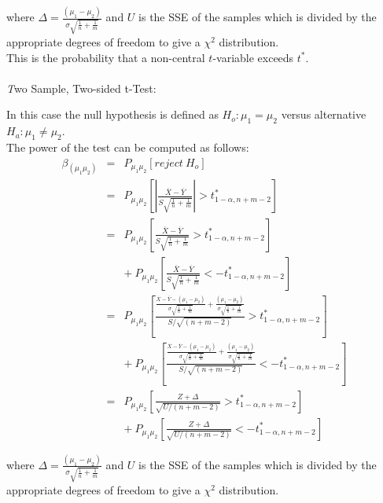 \documentclass[12pt,a4paper]{article}
\theoremstyle{regla}
\theoremstyle{remark}
\theoremstyle{definition}
\theoremstyle{nonumberbreak}
\begin{document}
where $\Delta = \frac{(\mu_1-\mu_2)}{\sigma\sqrt{\frac{1}{n}+\frac{1}{m}}} $ and 
$U$ is the SSE of the samples which is divided by the appropriate degrees of freedom to give a $\chi^2$ distribution.\\

This is the probability that a non-central $t$-variable exceeds $t^*$.\\\\

{\emph Two Sample, Two-sided t-Test}:

In this case the null hypothesis is defined as $H_o: \mu_1 = \mu_2$ versus alternative $H_a: \mu_1 \neq \mu_2$. \\

The power of the test can be computed as follows:\\

\begin{eqnarray*}
\beta_{(\mu_1\mu_2)}& = & P_{\mu_1\mu_2}\left[reject~H_o \right]\\
& = & P_{\mu_1\mu_2}\left[\left|\frac{\overline{X}-\overline{Y}}{S\sqrt{\frac{1}{n}+\frac{1}{m}}}\right| > t^*_{1-\alpha,n+m-2} \right]\\
& = & P_{\mu_1\mu_2}\left[\frac{\overline{X}-\overline{Y}}{S\sqrt{\frac{1}{n}+\frac{1}{m}}} > t^*_{1-\alpha,n+m-2} \right] \\
&& +\: P_{\mu_1\mu_2} \left[\frac{\overline{X}-\overline{Y}}{S\sqrt{\frac{1}{n}+\frac{1}{m}}} <-t^*_{1-\alpha,n+m-2} \right] \\
& = &  P_{\mu_1\mu_2}\left[\frac{\frac{\overline{X}-\overline{Y}-(\mu_1-\mu_2)}{\sigma\sqrt{\frac{1}{n}+\frac{1}{m}}}+\frac{(\mu_1-\mu_2)}{\sigma\sqrt{\frac{1}{n}+\frac{1}{m}}}}{S/\sqrt{(n+m-2)}} > t^*_{1-\alpha,n+m-2}\right] \\
&& +\:   P_{\mu_1\mu_2}\left[\frac{\frac{\overline{X}-\overline{Y}-(\mu_1-\mu_2)}{\sigma\sqrt{\frac{1}{n}+\frac{1}{m}}}+\frac{(\mu_1-\mu_2)}{\sigma\sqrt{\frac{1}{n}+\frac{1}{m}}}}{S/\sqrt{(n+m-2)}} < -t^*_{1-\alpha,n+m-2}\right]
\\
& = &  P_{\mu_1\mu_2}\left[ \frac{Z + \Delta}{\sqrt{U/(n+m-2)}} > t^*_{1-\alpha,n+m-2} \right]\\
&& +\: P_{\mu_1\mu_2}\left[ \frac{Z + \Delta}{\sqrt{U/(n+m-2)}} < -t^*_{1-\alpha,n+m-2} \right]
\end{eqnarray*}

where $\Delta = \frac{(\mu_1-\mu_2)}{\sigma\sqrt{\frac{1}{n}+\frac{1}{m}}} $ and 
$U$ is the SSE of the samples which is divided by the appropriate degrees of freedom to give a $\chi^2$ distribution.\\
\end{document}
